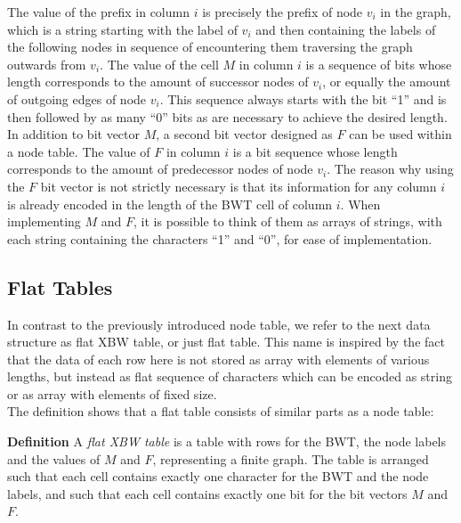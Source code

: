 \documentclass[a4paper,12pt,twoside,BCOR=10mm]{scrbook}
\begin{document}
The value of the prefix in column $ i $ is precisely the prefix of node $ v_i $ in the graph,
which is a string starting with the label of $ v_i $ and then containing
the labels of the following nodes in sequence of encountering them traversing
the graph outwards from $ v_i $.
The value of the cell $ M $ in column $ i $ is a sequence of bits whose length corresponds to
the amount of successor nodes of $ v_i $, or equally the amount of outgoing edges of node $ v_i $.
This sequence always starts with the bit “1” and is then followed
by as many “0” bits as are necessary to achieve the desired length.
In addition to bit vector $ M $, a second bit vector designed as $ F $ can be used within a node table.
The value of $ F $ in column $ i $ is a bit sequence whose length corresponds to
the amount of predecessor nodes of node $ v_i $.
The reason why using the $ F $ bit vector is not strictly necessary is that its information
for any column $ i $ is already encoded in the length of the BWT cell of column $ i $.
When implementing $ M $ and $ F $, it is possible to think of them as arrays of strings,
with each string containing the characters “1” and “0”, for ease of implementation.

\subsection{Flat Tables}
\label{sec:flat_table_definition}

In contrast to the previously introduced node table,
we refer to the next data structure as flat XBW table, or just flat table.
This name is inspired by the fact that the data of each row here is not
stored as array with elements of various lengths,
but instead as flat sequence of characters which can be encoded as string
or as array with elements of fixed size. \\
The definition shows that a flat table consists of similar parts as a node table:

\textbf{Definition} A \textit{flat XBW table}\label{def:flat_table} is a table with rows for the BWT,
the node labels and the values of $ M $ and $ F $,
representing a finite graph.
The table is arranged such that each cell contains exactly one character
for the BWT and the node labels, and such that each cell contains exactly
one bit for the bit vectors $ M $ and $ F $.
\end{document}
